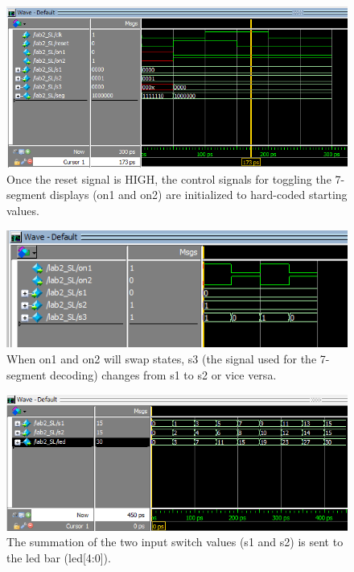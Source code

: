 \documentclass[11pt]{article}
\begin{document}
\begin{figure}[h!]
\centering
\includegraphics[scale=0.8]{yes_reset.png}
\caption{Once the reset signal is HIGH, the control signals for toggling the 7-segment displays (on1 and on2) are initialized to hard-coded starting values.}
\label{fig:wave_reset_yes}
\end{figure}


\begin{figure}[h!]
\centering
\includegraphics[scale=1]{toggling.png}
\caption{When on1 and on2 will swap states, s3 (the signal used for the 7-segment decoding) changes from s1 to s2 or vice versa.}
\label{fig:wave_toggle}
\end{figure}


\begin{figure}[h!]
\centering
\includegraphics[scale=1]{sum.png}
\caption{The summation of the two input switch values (s1 and s2) is sent to the led bar (led[4:0]).}
\label{fig:wave_sum}
\end{figure}
\end{document}

